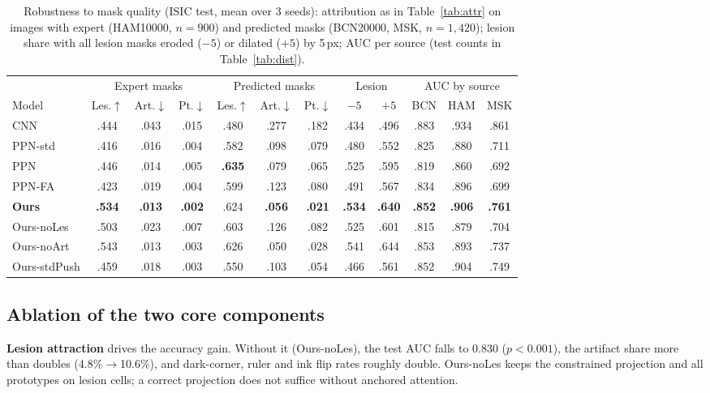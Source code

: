 \documentclass[conference]{IEEEtran}
\begin{document}
\begin{table}[t]
\caption{Robustness to mask quality (ISIC test, mean over 3 seeds): attribution as in Table~\ref{tab:attr} on images with expert (HAM10000, $n=900$) and predicted masks (BCN20000, MSK, $n=1{,}420$); lesion share with all lesion masks eroded ($-5$) or dilated ($+5$) by 5\,px; AUC per source (test counts in Table~\ref{tab:dist}).}
\label{tab:maskrob}
\centering
\scriptsize
\setlength{\tabcolsep}{1.2pt}
\begin{tabular}{l|ccc|ccc|cc|ccc}
\toprule
& \multicolumn{3}{c|}{Expert masks} & \multicolumn{3}{c|}{Predicted masks} & \multicolumn{2}{c|}{Lesion} & \multicolumn{3}{c}{AUC by source} \\
Model & Les.$\uparrow$ & Art.$\downarrow$ & Pt.$\downarrow$ & Les.$\uparrow$ & Art.$\downarrow$ & Pt.$\downarrow$ & $-5$ & $+5$ & BCN & HAM & MSK \\
\midrule
CNN & .444 & .043 & .015 & .480 & .277 & .182 & .434 & .496 & .883 & .934 & .861 \\
\midrule
PPN-std & .416 & .016 & .004 & .582 & .098 & .079 & .480 & .552 & .825 & .880 & .711 \\
PPN & .446 & .014 & .005 & \textbf{.635} & .079 & .065 & .525 & .595 & .819 & .860 & .692 \\
PPN-FA & .423 & .019 & .004 & .599 & .123 & .080 & .491 & .567 & .834 & .896 & .699 \\
\textbf{Ours} & \textbf{.534} & \textbf{.013} & \textbf{.002} & .624 & \textbf{.056} & \textbf{.021} & \textbf{.534} & \textbf{.640} & \textbf{.852} & \textbf{.906} & \textbf{.761} \\
\midrule
Ours-noLes & .503 & .023 & .007 & .603 & .126 & .082 & .525 & .601 & .815 & .879 & .704 \\
Ours-noArt & .543 & .013 & .003 & .626 & .050 & .028 & .541 & .644 & .853 & .893 & .737 \\
Ours-stdPush & .459 & .018 & .003 & .550 & .103 & .054 & .466 & .561 & .852 & .904 & .749 \\
\bottomrule
\end{tabular}
\end{table}

\subsection{Ablation of the two core components}
\label{sec:abl}
\textbf{Lesion attraction} drives the accuracy gain. Without it (Ours-noLes), the test AUC falls to 0.830 ($p<0.001$), the artifact share more than doubles (4.8\%$\rightarrow$10.6\%), and dark-corner, ruler and ink flip rates roughly double. Ours-noLes keeps the constrained projection and all prototypes on lesion cells; a correct projection does not suffice without anchored attention.
\end{document}
